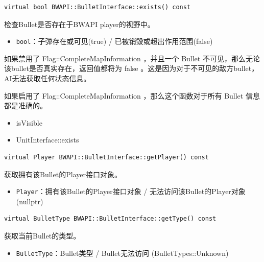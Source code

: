 \begin{tcolorbox}[colback=white, colframe=black!60!white, title=exists(), arc=0mm]
\begin{verbatim}    
virtual bool BWAPI::BulletInterface::exists() const
\end{verbatim}
检查Bullet是否存在于BWAPI player的视野中。
\begin{return}
    \begin{itemize}
        \item \texttt{bool}：子弹存在或可见(true) / 已被销毁或超出作用范围(false)
    \end{itemize}
\end{return}
如果禁用了  Flag::CompleteMapInformation  ，并且一个  Bullet  不可见，那么无论该bullet是否真实存在，返回值都将为  false  。这是因为对于不可见的敌方bullet，AI无法获取任何状态信息。\par
如果启用了  Flag::CompleteMapInformation  ，那么这个函数对于所有  Bullet  信息都是准确的。
\begin{refer}
    \begin{itemize}
        \item isVisible
        \item UnitInterface::exists
    \end{itemize}
\end{refer}
\end{tcolorbox}

\begin{tcolorbox}[colback=white, colframe=black!60!white, title=getPlayer(), arc=0mm]
    \begin{verbatim}
virtual Player BWAPI::BulletInterface::getPlayer() const
    \end{verbatim}
    获取拥有该Bullet的Player接口对象。
    \begin{return}
        \begin{itemize}
            \item \texttt{Player}：拥有该Bullet的Player接口对象 / 无法访问该Bullet的Player对象(nullptr)
        \end{itemize}
    \end{return}
\end{tcolorbox}


\begin{tcolorbox}[colback=white, colframe=black!60!white, title=getType(), arc=0mm]
    \begin{verbatim}
virtual BulletType BWAPI::BulletInterface::getType() const
    \end{verbatim}
    获取当前Bullet的类型。
    \begin{return}
        \begin{itemize}
            \item \texttt{BulletType}：Bullet类型 / Bullet无法访问 (BulletTypes::Unknown)
        \end{itemize}
    \end{return}
\end{tcolorbox}

